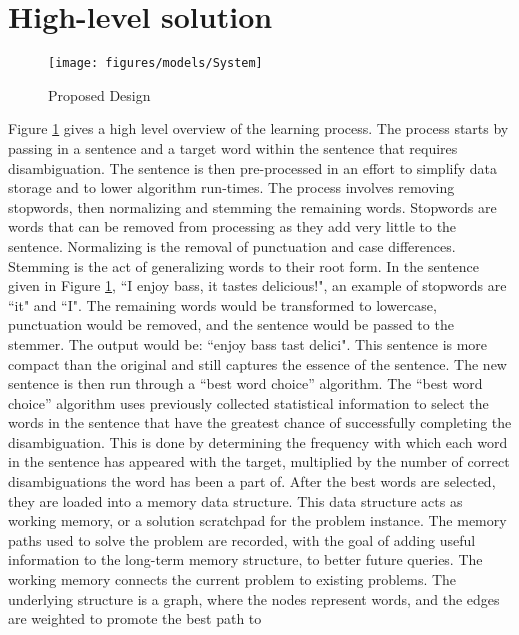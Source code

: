 \section{High-level solution}

\begin{figure}[htp]     
	\begin{center}
		\texttt{[image: figures/models/System]}
		\caption{Proposed Design 
		\label{fig:high_level_solution}}
	\end{center}
\end{figure}

Figure \ref{fig:high_level_solution} gives a high level overview of the learning process.  
The process starts by passing in a sentence and a target word within the sentence that requires 
disambiguation. The sentence is then pre-processed in an effort to simplify data storage and 
to lower algorithm run-times.  The process involves removing stopwords, then normalizing and stemming 
the remaining words. Stopwords are words that can be removed from processing as
they add very little to the sentence. Normalizing is the removal of punctuation and case
differences.  Stemming is the act of generalizing words to their root form. 
In the sentence given in Figure \ref{fig:high_level_solution}, 
``I enjoy bass, it tastes delicious!", an example of stopwords are ``it" and ``I". The
remaining words would be transformed to lowercase, punctuation would be removed, and the sentence would be passed to the stemmer. 
The output would be: ``enjoy bass tast delici". This sentence is more compact than the original 
and still captures the essence of the sentence. The new sentence is then run through a 
``best word choice'' algorithm. The ``best word choice'' algorithm uses previously collected 
statistical information to select the words in the sentence that have the greatest chance of 
successfully completing the disambiguation. This is done by determining the frequency with which each word 
in the sentence has appeared with the target, multiplied by the number of correct disambiguations 
the word has been a part of. After the best words are selected, they are loaded 
into a memory data structure. This data structure acts as working memory, or a solution scratchpad
for the problem instance. The memory paths used to solve the problem are recorded, with 
the goal of adding useful information to the long-term memory structure, to better future queries. 
The working memory connects the current problem to existing problems. The underlying structure is 
a graph, where the nodes represent words, and the edges are weighted to promote the best path to 

